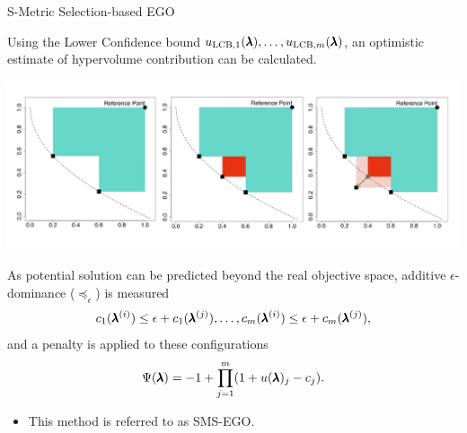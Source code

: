 \begin{frame}[allowframebreaks]{S-Metric Selection-based EGO}

    Using the Lower Confidence bound $u_{\text{LCB}, 1}(\pmb{\lambda}), \dots, u_{\text{LCB}, m}(\pmb{\lambda})$, an optimistic estimate of hypervolume contribution can be calculated.

    \begin{center}
        \includegraphics[scale=0.35]{images/hv_contribution_2}
    \end{center}

    \framebreak

    As potential solution can be predicted beyond the real objective space, additive $\epsilon$-dominance ($\preceq_\epsilon$) is measured
            $$
                c_1(\pmb{\lambda}^{(i)}) \le \epsilon+c_1(\pmb{\lambda}^{(j)}), \dots, c_m(\pmb{\lambda}^{(i)}) \le \epsilon+c_m(\pmb{\lambda}^{(j)}),
            $$
            and a penalty is applied to these configurations
            $$
                \Psi(\pmb{\lambda}) = -1 + \prod_{j=1}^m(1+u(\pmb{\lambda})_j - c_j).
            $$

    \begin{itemize}
        \item This method is referred to as SMS-EGO.
    \end{itemize}
\end{frame}

